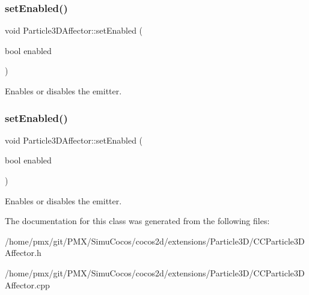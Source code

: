 \subsubsection{\texorpdfstring{set\+Enabled()}{setEnabled()}\hspace{0.1cm}{\footnotesize\ttfamily [1/2]}}
{\footnotesize\ttfamily void Particle3\+D\+Affector\+::set\+Enabled (\begin{DoxyParamCaption}\item[{bool}]{enabled }\end{DoxyParamCaption})\hspace{0.3cm}{\ttfamily [inline]}}

Enables or disables the emitter. \mbox{\label{classParticle3DAffector_a5836aa8d810adcaefd9ba19fd40e3615}} 
\subsubsection{\texorpdfstring{set\+Enabled()}{setEnabled()}\hspace{0.1cm}{\footnotesize\ttfamily [2/2]}}
{\footnotesize\ttfamily void Particle3\+D\+Affector\+::set\+Enabled (\begin{DoxyParamCaption}\item[{bool}]{enabled }\end{DoxyParamCaption})\hspace{0.3cm}{\ttfamily [inline]}}

Enables or disables the emitter. 

The documentation for this class was generated from the following files\+:\begin{DoxyCompactItemize}
\item 
/home/pmx/git/\+P\+M\+X/\+Simu\+Cocos/cocos2d/extensions/\+Particle3\+D/C\+C\+Particle3\+D\+Affector.\+h\item 
/home/pmx/git/\+P\+M\+X/\+Simu\+Cocos/cocos2d/extensions/\+Particle3\+D/C\+C\+Particle3\+D\+Affector.\+cpp\end{DoxyCompactItemize}
